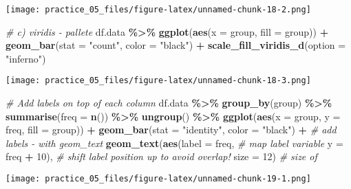 \documentclass[
]{article}
\newenvironment{Shaded}{\begin{snugshade}}{\end{snugshade}}
\newcommand{\AttributeTok}[1]{\textcolor[rgb]{0.13,0.29,0.53}{#1}}
\newcommand{\CommentTok}[1]{\textcolor[rgb]{0.56,0.35,0.01}{\textit{#1}}}
\newcommand{\DecValTok}[1]{\textcolor[rgb]{0.00,0.00,0.81}{#1}}
\newcommand{\FunctionTok}[1]{\textcolor[rgb]{0.13,0.29,0.53}{\textbf{#1}}}
\newcommand{\NormalTok}[1]{#1}
\newcommand{\SpecialCharTok}[1]{\textcolor[rgb]{0.81,0.36,0.00}{\textbf{#1}}}
\newcommand{\StringTok}[1]{\textcolor[rgb]{0.31,0.60,0.02}{#1}}
\begin{document}
\texttt{[image: practice\_05\_files/figure-latex/unnamed-chunk-18-2.png]}

\begin{Shaded}
\begin{Highlighting}[]
\CommentTok{\# c) viridis {-} pallete}
\NormalTok{df.data }\SpecialCharTok{\%\textgreater{}\%} 
  \FunctionTok{ggplot}\NormalTok{(}\FunctionTok{aes}\NormalTok{(}\AttributeTok{x =}\NormalTok{ group,}
             \AttributeTok{fill =}\NormalTok{ group)) }\SpecialCharTok{+}
  \FunctionTok{geom\_bar}\NormalTok{(}\AttributeTok{stat =} \StringTok{"count"}\NormalTok{,}
           \AttributeTok{color =} \StringTok{"black"}\NormalTok{) }\SpecialCharTok{+}
  \FunctionTok{scale\_fill\_viridis\_d}\NormalTok{(}\AttributeTok{option =} \StringTok{"inferno"}\NormalTok{)}
\end{Highlighting}
\end{Shaded}

\texttt{[image: practice\_05\_files/figure-latex/unnamed-chunk-18-3.png]}

\begin{Shaded}
\begin{Highlighting}[]
\CommentTok{\# Add labels on top of each column}
\NormalTok{df.data }\SpecialCharTok{\%\textgreater{}\%}
  \FunctionTok{group\_by}\NormalTok{(group) }\SpecialCharTok{\%\textgreater{}\%} 
  \FunctionTok{summarise}\NormalTok{(}\AttributeTok{freq =} \FunctionTok{n}\NormalTok{()) }\SpecialCharTok{\%\textgreater{}\%} 
  \FunctionTok{ungroup}\NormalTok{() }\SpecialCharTok{\%\textgreater{}\%} 
  \FunctionTok{ggplot}\NormalTok{(}\FunctionTok{aes}\NormalTok{(}\AttributeTok{x =}\NormalTok{ group,}
             \AttributeTok{y =}\NormalTok{ freq,}
             \AttributeTok{fill =}\NormalTok{ group)) }\SpecialCharTok{+}
  \FunctionTok{geom\_bar}\NormalTok{(}\AttributeTok{stat =} \StringTok{"identity"}\NormalTok{,}
           \AttributeTok{color =} \StringTok{"black"}\NormalTok{) }\SpecialCharTok{+}
  \CommentTok{\# add labels {-} with geom\_text}
  \FunctionTok{geom\_text}\NormalTok{(}\FunctionTok{aes}\NormalTok{(}\AttributeTok{label =}\NormalTok{ freq,   }\CommentTok{\# map label variable}
                \AttributeTok{y =}\NormalTok{ freq }\SpecialCharTok{+} \DecValTok{10}\NormalTok{), }\CommentTok{\# shift label position up to avoid overlap!}
            \AttributeTok{size =} \DecValTok{12}\NormalTok{)          }\CommentTok{\# size of }
\end{Highlighting}
\end{Shaded}

\texttt{[image: practice\_05\_files/figure-latex/unnamed-chunk-19-1.png]}
\end{document}
